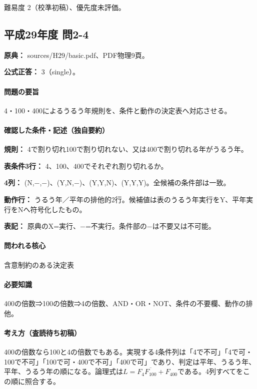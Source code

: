 \par 難易度 2（校準初稿）、優先度未評価。

\subsection{平成29年度 問2-4}
\label{q:h29-reg-basic-2-4}

\noindent\textbf{原典：} sources/H29/basic.pdf、PDF物理9頁。

\textbf{公式正答：} 3（single）。

\paragraph{問題の要旨} 4・100・400によるうるう年規則を、条件と動作の決定表へ対応させる。

\paragraph{確認した条件・記述（独自要約）}\mbox{}\par

\noindent\textbf{規則：} 4で割り切れ100で割り切れない、又は400で割り切れる年がうるう年。\par

\noindent\textbf{表条件3行：} 4、100、400でそれぞれ割り切れるか。\par

\noindent\textbf{4列：} (N,−,−)、(Y,N,−)、(Y,Y,N)、(Y,Y,Y)。全候補の条件部は一致。\par

\noindent\textbf{動作行：} うるう年／平年の排他的2行。候補値は表のうるう年実行をY、平年実行をNへ符号化したもの。\par

\noindent\textbf{表記：} 原典のX=実行、−=不実行。条件部の−は不要又は不可能。\par

\paragraph{問われる核心} 含意制約のある決定表

\paragraph{必要知識} 400の倍数⇒100の倍数⇒4の倍数、AND・OR・NOT、条件の不要欄、動作の排他。

\paragraph{考え方（査読待ち初稿）} 400の倍数なら100と4の倍数でもある。実現する4条件列は「4で不可」「4で可・100で不可」「100で可・400で不可」「400で可」であり、判定は平年、うるう年、平年、うるう年の順になる。論理式は\(L=F_4\overline{F_{100}}+F_{400}\)である。4列すべてをこの順に照合する。

